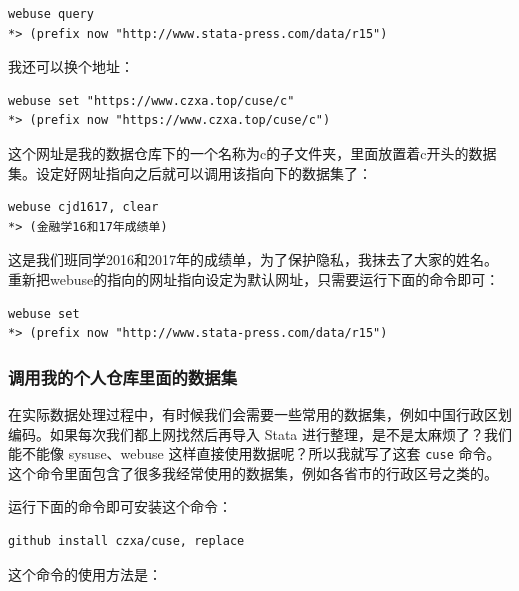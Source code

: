 \documentclass[]{ctexbook}
\begin{document}
\begin{lstlisting}
webuse query
*> (prefix now "http://www.stata-press.com/data/r15")
\end{lstlisting}

我还可以换个地址：

\begin{lstlisting}
webuse set "https://www.czxa.top/cuse/c"
*> (prefix now "https://www.czxa.top/cuse/c")
\end{lstlisting}

这个网址是我的数据仓库下的一个名称为c的子文件夹，里面放置着c开头的数据集。设定好网址指向之后就可以调用该指向下的数据集了：

\begin{lstlisting}
webuse cjd1617, clear
*> (金融学16和17年成绩单)
\end{lstlisting}

这是我们班同学2016和2017年的成绩单，为了保护隐私，我抹去了大家的姓名。
重新把webuse的指向的网址指向设定为默认网址，只需要运行下面的命令即可：

\begin{lstlisting}
webuse set
*> (prefix now "http://www.stata-press.com/data/r15")
\end{lstlisting}

\hypertarget{section-14}{%
\subsubsection{调用我的个人仓库里面的数据集}\label{section-14}}

在实际数据处理过程中，有时候我们会需要一些常用的数据集，例如中国行政区划编码。如果每次我们都上网找然后再导入 Stata 进行整理，是不是太麻烦了？我们能不能像 sysuse、webuse 这样直接使用数据呢？所以我就写了这套 \texttt{cuse} 命令。这个命令里面包含了很多我经常使用的数据集，例如各省市的行政区号之类的。

运行下面的命令即可安装这个命令：

\begin{lstlisting}
github install czxa/cuse, replace
\end{lstlisting}

这个命令的使用方法是：
\end{document}
